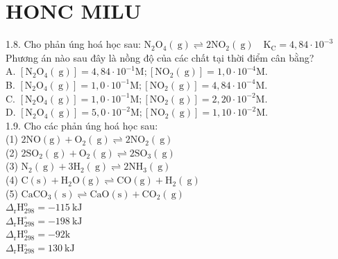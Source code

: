 \documentclass[10pt]{article}
\begin{document}
\section*{HONC MILU}
1.8. Cho phản úng hoá học sau: $\mathrm{N}_{2} \mathrm{O}_{4}(\mathrm{~g}) \rightleftharpoons 2 \mathrm{NO}_{2}(\mathrm{~g}) \quad \mathrm{K}_{\mathrm{C}}=4,84 \cdot 10^{-3}$ Phương án nào sau đây là nồng độ của các chất tại thời điểm cân bằng?\\
A. $\left[\mathrm{N}_{2} \mathrm{O}_{4}(\mathrm{~g})\right]=4,84 \cdot 10^{-1} \mathrm{M} ;\left[\mathrm{NO}_{2}(\mathrm{~g})\right]=1,0 \cdot 10^{-4} \mathrm{M}$.\\
B. $\left[\mathrm{N}_{2} \mathrm{O}_{4}(\mathrm{~g})\right]=1,0 \cdot 10^{-1} \mathrm{M} ;\left[\mathrm{NO}_{2}(\mathrm{~g})\right]=4,84 \cdot 10^{-4} \mathrm{M}$.\\
C. $\left[\mathrm{N}_{2} \mathrm{O}_{4}(\mathrm{~g})\right]=1,0 \cdot 10^{-1} \mathrm{M} ;\left[\mathrm{NO}_{2}(\mathrm{~g})\right]=2,20 \cdot 10^{-2} \mathrm{M}$.\\
D. $\left[\mathrm{N}_{2} \mathrm{O}_{4}(\mathrm{~g})\right]=5,0 \cdot 10^{-2} \mathrm{M} ;\left[\mathrm{NO}_{2}(\mathrm{~g})\right]=1,10 \cdot 10^{-2} \mathrm{M}$.\\
1.9. Cho các phản úng hoá học sau:\\
(1) $2 \mathrm{NO}(\mathrm{g})+\mathrm{O}_{2}(\mathrm{~g}) \rightleftharpoons 2 \mathrm{NO}_{2}(\mathrm{~g})$\\
(2) $2 \mathrm{SO}_{2}(\mathrm{~g})+\mathrm{O}_{2}(\mathrm{~g}) \rightleftharpoons 2 \mathrm{SO}_{3}(\mathrm{~g})$\\
(3) $\mathrm{N}_{2}(\mathrm{~g})+3 \mathrm{H}_{2}(\mathrm{~g}) \rightleftharpoons 2 \mathrm{NH}_{3}(\mathrm{~g})$\\
(4) $\mathrm{C}(\mathrm{s})+\mathrm{H}_{2} \mathrm{O}(\mathrm{g}) \rightleftharpoons \mathrm{CO}(\mathrm{g})+\mathrm{H}_{2}(\mathrm{~g})$\\
(5) $\mathrm{CaCO}_{3}(\mathrm{~s}) \rightleftharpoons \mathrm{CaO}(\mathrm{s})+\mathrm{CO}_{2}(\mathrm{~g})$\\
$\Delta_{\mathrm{r}} \mathrm{H}_{298}^{\mathrm{o}}=-115 \mathrm{~kJ}$\\
$\Delta_{\mathrm{r}} \mathrm{H}_{298}^{\circ}=-198 \mathrm{~kJ}$\\
$\Delta_{\mathrm{r}} \mathrm{H}_{298}^{\mathrm{o}}=-92 \mathrm{k}$\\
$\Delta_{\mathrm{r}} \mathrm{H}_{298}^{\circ}=130 \mathrm{~kJ}$\\
\end{document}
